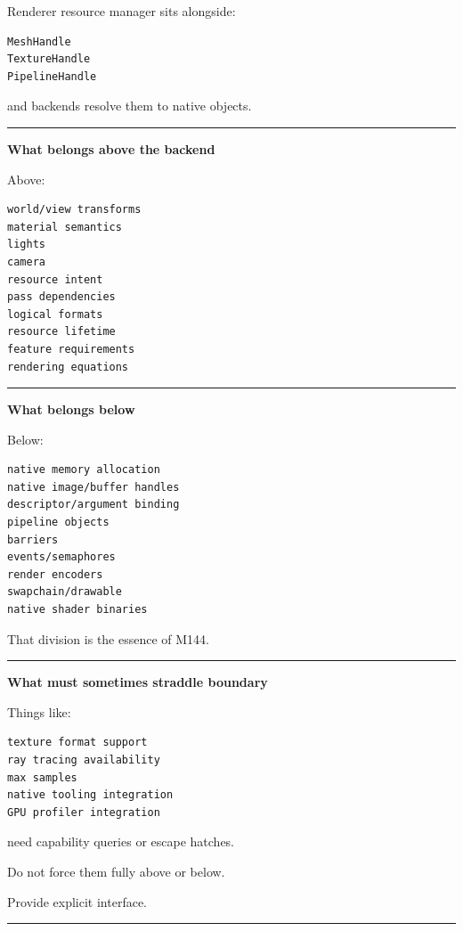 Renderer resource manager sits alongside:

\begin{verbatim}
MeshHandle
TextureHandle
PipelineHandle
\end{verbatim}

and backends resolve them to native objects.

\begin{center}\rule{0.5\linewidth}{0.5pt}\end{center}

\textbf{What belongs above the backend}

Above:

\begin{verbatim}
world/view transforms
material semantics
lights
camera
resource intent
pass dependencies
logical formats
resource lifetime
feature requirements
rendering equations
\end{verbatim}

\begin{center}\rule{0.5\linewidth}{0.5pt}\end{center}

\textbf{What belongs below}

Below:

\begin{verbatim}
native memory allocation
native image/buffer handles
descriptor/argument binding
pipeline objects
barriers
events/semaphores
render encoders
swapchain/drawable
native shader binaries
\end{verbatim}

That division is the essence of M144.

\begin{center}\rule{0.5\linewidth}{0.5pt}\end{center}

\textbf{What must sometimes straddle boundary}

Things like:

\begin{verbatim}
texture format support
ray tracing availability
max samples
native tooling integration
GPU profiler integration
\end{verbatim}

need capability queries or escape hatches.

Do not force them fully above or below.

Provide explicit interface.

\begin{center}\rule{0.5\linewidth}{0.5pt}\end{center}

